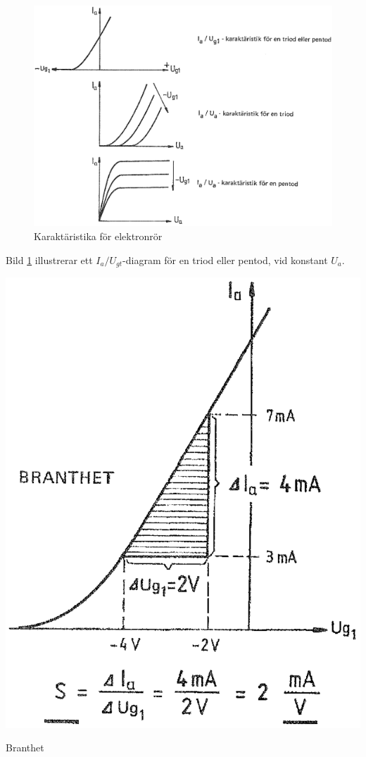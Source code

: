 \begin{figure}
\includegraphics[width=\textwidth]{images/cropped_pdfs/bild_2_2-32.pdf}
\caption{Karaktäristika för elektronrör}
\label{fig:BildII2-32}
\end{figure}

Bild \ref{fig:BildII2-32} illustrerar ett \(I_a/U_{gt}\)-diagram för en triod
eller pentod, vid konstant \(U_a\).

\begin{marginfigure}%
	\includegraphics[width=\textwidth]{images/cropped_pdfs/bild_2_2-33.pdf}
	\caption{Branthet}
	\label{fig:BildII2-33}
\end{marginfigure}

